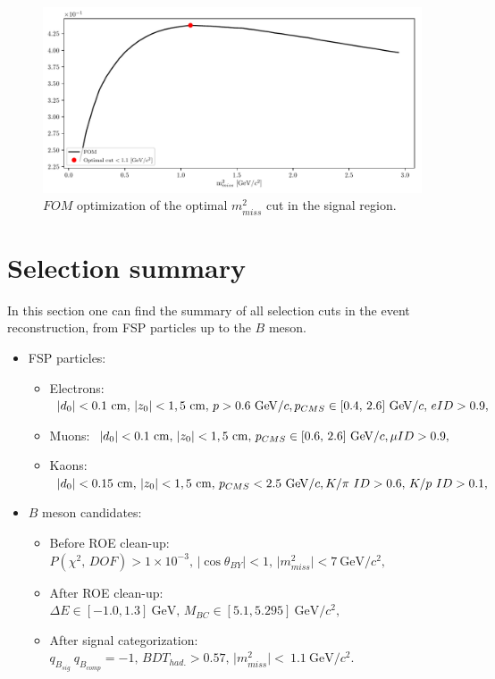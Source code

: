 \documentclass[oneside,a4paper,openany,12pt]{scrbook}
\newcommand {\e}[1]{\mathrm{~#1}}
\newcommand {\E}[1]{\times 10^{#1}}
\begin{document}
\begin{figure}[H]
\centering
\captionsetup{width=0.8\linewidth}
\includegraphics[width=\linewidth]{fig/missm2_opt}
\caption{$FOM$ optimization of the optimal $m_{miss}^2$ cut in the signal region.}
\label{fig:missm2opt}
\end{figure}

\section{Selection summary}
\label{s:ss}
In this section one can find the summary of all selection cuts in the event reconstruction, from FSP particles up to the $B$ meson.

\begin{itemize}
\item FSP particles:
	\begin{itemize}
	\item Electrons: $\vert d_0 \vert < 0.1\e{cm},\,\vert z_0 \vert < 1,5\e{cm},\,p>0.6\e{GeV}/c,\\p_{CMS}\in[0.4,\,2.6]\e{GeV}/c,\,eID>0.9,$
    \item Muons: $\vert d_0 \vert < 0.1\e{cm},\,\vert z_0 \vert < 1,5\e{cm},\,p_{CMS}\in[0.6,\,2.6]\e{GeV}/c,\\\mu ID>0.9,$
    \item Kaons: $\vert d_0 \vert < 0.15\e{cm},\,\vert z_0 \vert < 1,5\e{cm},\,p_{CMS} < 2.5\e{GeV}/c,\\K/\pi~ID>0.6,\,K/p~ID>0.1,$
	\end{itemize}
\item $B$ meson candidates:
	\begin{itemize}
	\item Before ROE clean-up: $P(\chi^2,\,DOF) > 1\E{-3},\,\vert \cos \theta_{BY} \vert < 1,\,\vert m_{miss}^2 \vert < 7\e{GeV}/c^2,$
    \item After ROE clean-up: $\Delta E \in [-1.0,1.3]\e{GeV},\,M_{BC} \in [5.1,5.295]\e{GeV}/c^2,$
    \item After signal categorization: $q_{B_{sig}}~q_{B_{comp}} = -1,\,BDT_{had.} > 0.57,\,\vert m_{miss}^2\vert<~1.1\e{GeV}/c^2.$
	\end{itemize}
\end{itemize}
\end{document}
